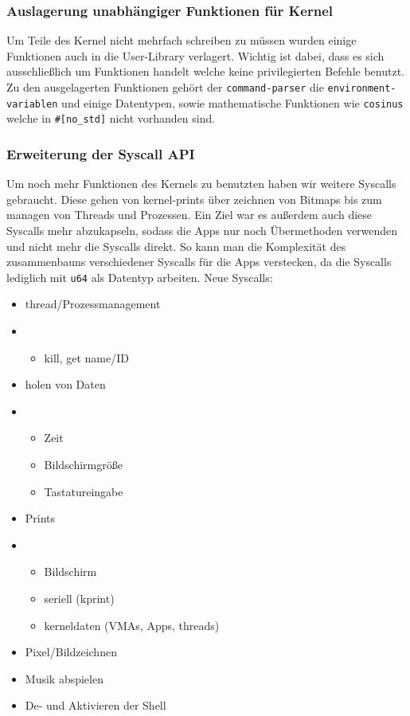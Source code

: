     \subsubsection{Auslagerung unabhängiger Funktionen für Kernel}
        Um Teile des Kernel nicht mehrfach schreiben zu müssen wurden einige Funktionen auch in die User-Library verlagert. Wichtig ist dabei, dass es sich ausschließlich um Funktionen handelt welche keine privilegierten Befehle benutzt. Zu den ausgelagerten Funktionen gehört der \verb|command-parser| die \verb|environment-variablen| und einige Datentypen, sowie mathematische Funktionen wie \verb|cosinus| welche in \verb|#[no_std]| nicht vorhanden sind.


    \subsubsection{Erweiterung der Syscall API}
        Um noch mehr Funktionen des Kernels zu benutzten haben wir weitere Syscalls gebraucht. Diese gehen von kernel-prints über zeichnen von Bitmaps bis zum managen von Threads und Prozessen. \newline
        Ein Ziel war es außerdem auch diese Syscalls mehr abzukapseln, sodass die Apps nur noch Übermethoden verwenden und nicht mehr die Syscalls direkt. So kann man die Komplexität des zusammenbauns verschiedener Syscalls für die Apps verstecken, da die Syscalls lediglich mit \verb|u64| als Datentyp arbeiten. \newline
        Neue Syscalls:
        \begin{itemize}
            \item thread/Prozessmanagement
            \item [] \begin{itemize}
                \item kill, get name/ID
            \end{itemize}
            \item holen von Daten
            \item [] \begin{itemize}
                \item Zeit
                \item Bildschirmgröße
                \item Tastatureingabe
            \end{itemize}
            \item Prints
            \item [] \begin{itemize}
                \item Bildschirm
                \item seriell (kprint)
                \item kerneldaten (VMAs, Apps, threads)
            \end{itemize}
            \item Pixel/Bildzeichnen
            \item Musik abspielen
            \item De- und Aktivieren der Shell
        \end{itemize}
